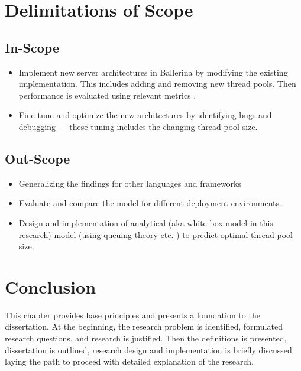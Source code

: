 
\section{Delimitations of Scope}

\subsection{In-Scope}

\begin{itemize}
	\item Implement new server architectures in Ballerina by modifying the existing implementation. This includes adding and removing new thread pools. Then performance is evaluated using relevant metrics .
	\item Fine tune and optimize the new architectures by identifying bugs and debugging — these tuning includes the changing thread pool size.
\end{itemize}

\subsection{Out-Scope}

\begin{itemize}
	\item Generalizing the findings for other languages and frameworks
	\item Evaluate and compare the model for different deployment environments.
	\item Design and implementation of analytical (aka white box model in this research) model (using queuing theory etc. ) to predict optimal thread pool size.
\end{itemize}

\section{Conclusion}	

This chapter provides base principles and presents a foundation to the dissertation. At the beginning, the research problem is identified, formulated research questions, and research is justified. Then the definitions is presented, dissertation is outlined, research design and implementation is briefly discussed laying the path to proceed with detailed explanation of the research.